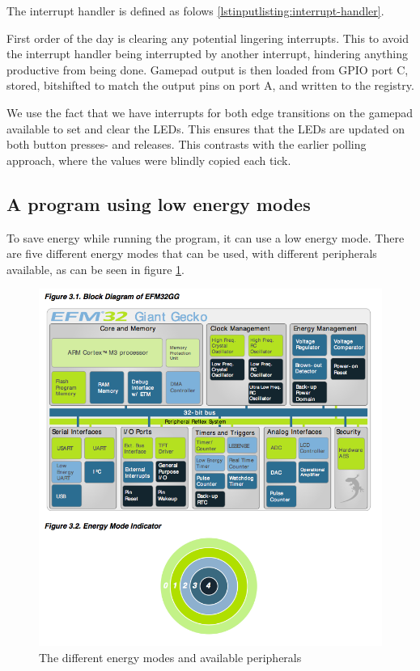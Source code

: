 
\label{lstinputlisting:interrupt-handlers}

The interrupt handler is defined as folows \ref{lstinputlisting:interrupt-handler}.

First order of the day is clearing any potential lingering interrupts. This to avoid the interrupt handler being interrupted by another interrupt, hindering anything productive from being done.
Gamepad output is then loaded from GPIO port C, stored, bitshifted to match the output pins on port A, and written to the registry.

We use the fact that we have interrupts for both edge transitions on the gamepad available to set and clear the LEDs. This ensures that the LEDs are updated on both button presses- and releases. This contrasts with the earlier polling approach, where the values were blindly copied each tick.



\label{lstinputlisting:interrupt-handler}

\subsection{A program using low energy modes}
To save energy while running the program, it can use a low energy mode.
There are five different energy modes that can be used, with different peripherals available, as can be seen in figure \ref{fig:energy_modes}.\cite{referencemanual}

\begin{figure}[H]
\centering
\includegraphics[scale=0.3]{figures/energymodes.png}
\caption{The different energy modes and available peripherals}
\label{fig:energy_modes}
\end{figure}

